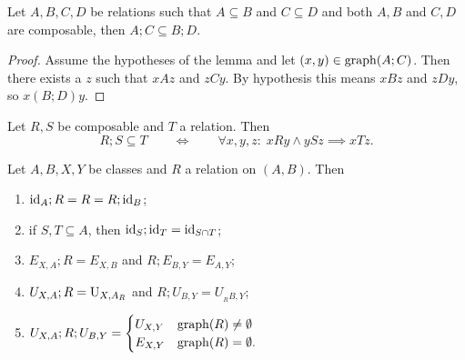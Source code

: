 \begin{lemma}
Let $A,B,C,D$ be relations such that $A \subseteq B$ and $C\subseteq D$ and both $A,B$ and $C,D$ are composable, then $A;C\subseteq B;D$.
\end{lemma}
\begin{proof}
Assume the hypotheses of the lemma and let $(x,y) \in \operatorname{graph}(A;C)$. Then there exists a $z$ such that $xAz$ and $zCy$. By hypothesis this means $xBz$ and $zDy$, so $x(B;D)y$.
\end{proof}

\begin{lemma} \label{universalQuantificationForCompositionSuperset}
Let $R,S$ be composable and $T$ a relation. Then
\[ R;S \subseteq T \qquad\iff\qquad \forall x,y,z:\; xRy \land ySz \implies xTz. \]
\end{lemma}

\begin{lemma} \label{compositionCanonicalRelations}
Let $A,B,X, Y$ be classes and $R$ a relation on $(A, B)$. Then
\begin{enumerate}
\item $\operatorname{id}_A;R = R = R;\operatorname{id}_B$;
\item if $S,T\subseteq A$, then $\operatorname{id}_{S};\operatorname{id}_{T} = \operatorname{id}_{S\cap T}$;
\item $E_{X,A};R = E_{X,B}$ and $R; E_{B,Y} = E_{A,Y}$;
\item $U_{X,A};R = \operatorname{U}_{X,A_R}$ and $R; U_{B,Y} = U_{_RB, Y}$;
\item $U_{X,A};R;U_{B,Y} = \begin{cases}
U_{X,Y} & \operatorname{graph}(R) \neq \emptyset \\
E_{X,Y} & \operatorname{graph}(R) = \emptyset.
\end{cases}$
\end{enumerate}
\end{lemma}

